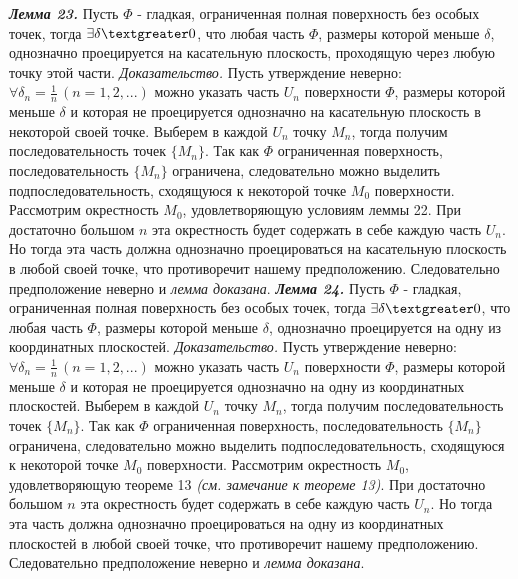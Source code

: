 \documentclass[12pt,a4paper]{article}
\begin{document}
	\newline
	\newline
	\textit{\textbf{Лемма 23.}} Пусть $\Phi$ - гладкая, ограниченная полная поверхность без особых точек, тогда $\exists \delta \textgreater 0$, что любая часть $\Phi$, размеры которой меньше $\delta$, однозначно проецируется на касательную плоскость, проходящую через любую точку этой части.
	\newline
	\newline
	\textit{Доказательство.}
	\newline
	Пусть утверждение неверно: $\forall \delta_{n} = \frac{1}{n} \, (n = 1, 2, ...)$ можно указать часть $U_{n}$ поверхности $\Phi$, размеры которой меньше $\delta$ и которая не проецируется однозначно на касательную плоскость в некоторой своей точке. Выберем в каждой $U_{n}$ точку $M_{n}$, тогда получим последовательность точек $\{M_{n}\}$. Так как $\Phi$ ограниченная поверхность, последовательность $\{M_{n}\}$ ограничена, следовательно можно выделить подпоследовательность, сходящуюся к некоторой точке $M_{0}$ поверхности. Рассмотрим окрестность $M_{0}$, удовлетворяющую условиям леммы 22. При достаточно большом $n$ эта окрестность будет содержать в себе каждую часть $U_{n}$. Но тогда эта часть должна однозначно проецироваться на касательную плоскость в любой своей точке, что противоречит нашему предположению. Следовательно предположение неверно и \textit{лемма доказана}.
	\newline
	\newline
	\textit{\textbf{Лемма 24.}} Пусть $\Phi$ - гладкая, ограниченная полная поверхность без особых точек, тогда $\exists \delta \textgreater 0$, что любая часть $\Phi$, размеры которой меньше $\delta$, однозначно проецируется на одну из координатных плоскостей.
	\newline
	\newline
	\textit{Доказательство.}
	\newline
	Пусть утверждение неверно: $\forall \delta_{n} = \frac{1}{n} \, (n = 1, 2, ...)$ можно указать часть $U_{n}$ поверхности $\Phi$, размеры которой меньше $\delta$ и которая не проецируется однозначно на одну из координатных плоскостей. Выберем в каждой $U_{n}$ точку $M_{n}$, тогда получим последовательность точек $\{M_{n}\}$. Так как $\Phi$ ограниченная поверхность, последовательность $\{M_{n}\}$ ограничена, следовательно можно выделить подпоследовательность, сходящуюся к некоторой точке $M_{0}$ поверхности. Рассмотрим окрестность $M_{0}$, удовлетворяющую теореме 13 \textit{(см. замечание к теореме 13)}. При достаточно большом $n$ эта окрестность будет содержать в себе каждую часть $U_{n}$. Но тогда эта часть должна однозначно проецироваться на одну из координатных плоскостей в любой своей точке, что противоречит нашему предположению. Следовательно предположение неверно и \textit{лемма доказана}.
\end{document}
